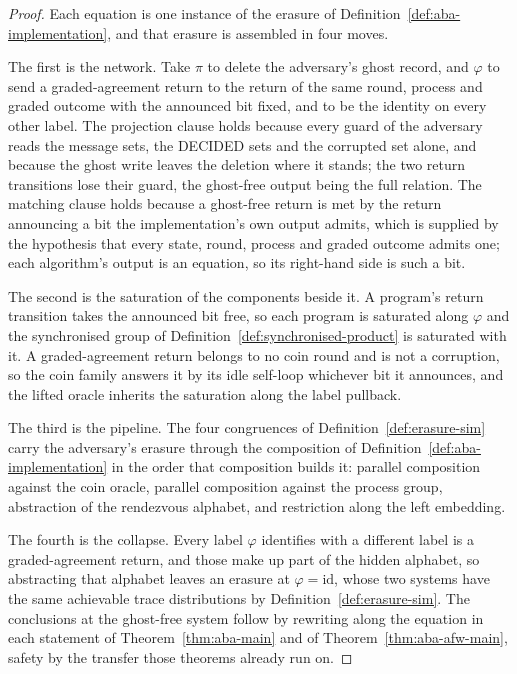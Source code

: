 \begin{proof}\leanok
  Each equation is one instance of the erasure of Definition~\ref{def:aba-implementation}, and that erasure is assembled in four moves.

  The first is the network.
  Take $\pi$ to delete the adversary's ghost record, and $\varphi$ to send a graded-agreement return to the return of the same round, process and graded outcome with the announced bit fixed, and to be the identity on every other label.
  The projection clause holds because every guard of the adversary reads the message sets, the DECIDED sets and the corrupted set alone, and because the ghost write leaves the deletion where it stands; the two return transitions lose their guard, the ghost-free output being the full relation.
  The matching clause holds because a ghost-free return is met by the return announcing a bit the implementation's own output admits, which is supplied by the hypothesis that every state, round, process and graded outcome admits one; each algorithm's output is an equation, so its right-hand side is such a bit.

  The second is the saturation of the components beside it.
  A program's return transition takes the announced bit free, so each program is saturated along $\varphi$ and the synchronised group of Definition~\ref{def:synchronised-product} is saturated with it.
  A graded-agreement return belongs to no coin round and is not a corruption, so the coin family answers it by its idle self-loop whichever bit it announces, and the lifted oracle inherits the saturation along the label pullback.

  The third is the pipeline.
  The four congruences of Definition~\ref{def:erasure-sim} carry the adversary's erasure through the composition of Definition~\ref{def:aba-implementation} in the order that composition builds it: parallel composition against the coin oracle, parallel composition against the process group, abstraction of the rendezvous alphabet, and restriction along the left embedding.

  The fourth is the collapse.
  Every label $\varphi$ identifies with a different label is a graded-agreement return, and those make up part of the hidden alphabet, so abstracting that alphabet leaves an erasure at $\varphi = \mathrm{id}$, whose two systems have the same achievable trace distributions by Definition~\ref{def:erasure-sim}.
  The conclusions at the ghost-free system follow by rewriting along the equation in each statement of Theorem~\ref{thm:aba-main} and of Theorem~\ref{thm:aba-afw-main}, safety by the transfer those theorems already run on.
\end{proof}
